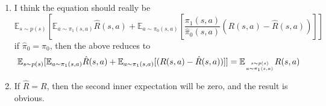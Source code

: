 
\begin{answer}
    \begin{enumerate}
        \item
    I think the equation should really be
$$
\mathbb E_{s\sim p(s)}[\mathbb E_{a\sim \pi_1(s, a)}\hat R(s, a) + \mathbb E_{a\sim \pi_0(s, a)}[\frac{\pi_1(s, a)}{\hat\pi_0(s, a)}(R(s, a) - \hat R(s, a))]]
$$
if $\hat \pi_0 = \pi_0$, then the above reduces to
$$
\mathbb E_{s\sim p(s)}[\mathbb E_{a\sim \pi_1(s, a)}\hat R(s, a) + \mathbb E_{a\sim \pi_1(s, a)}[(R(s, a) - \hat R(s, a))]] =\mathbb{E}_{s \sim p(s) \atop a \sim \pi_{1}(s, a)} R(s, a)
$$
    \item If $\hat R = R$, then the second inner expectation will be zero, and the result is obvious.
    \end{enumerate}

\end{answer}
